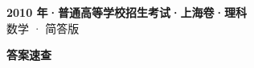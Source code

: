 \documentclass[zihao=-4, a4paper]{ctexart}
\begin{document}
\begin{center}
  {\Large\bfseries 2010 年·普通高等学校招生考试·上海卷·理科}\\[4pt]
  {\large 数学 · 简答版}
\end{center}
\medskip
{}

\clearpage
{}
\begin{center}{\Large\bfseries 答案速查}\end{center}
\medskip

\end{document}
